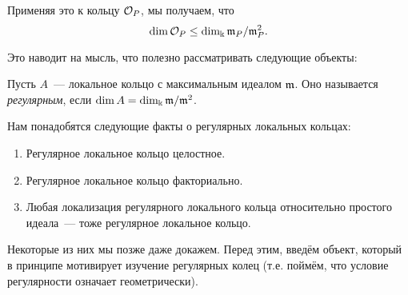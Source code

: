 	   	Применяя это к кольцу $\mathcal{O}_{P}$, мы получаем, что 
	   	\[
	   		\dim{\mathcal{O}_{P}} \le \dim_{\Bbbk}{\mathfrak{m}_P/\mathfrak{m}_P^2}.
	   	\]

	   	Это наводит на мысль, что полезно рассматривать следующие объекты:

	   	\begin{definition}\label{regular_rings} 
	   		Пусть $A$~--- локальное кольцо с максимальным идеалом $\mathfrak{m}$. Оно называется \emph{регулярным}, если $\dim{A} = \dim_{\Bbbk}{\mathfrak{m}/\mathfrak{m}^2}$.
	   	\end{definition}

	   	Нам понадобятся следующие факты о регулярных локальных кольцах: 

	   	\begin{enumerate}
	   		\item Регулярное локальное кольцо целостное. 

	   		\item Регулярное локальное кольцо факториально. 

	   		\item Любая локализация регулярного локального кольца относительно простого идеала~--- тоже регулярное локальное кольцо. 
	   	\end{enumerate}

	   	Некоторые из них мы позже даже докажем. Перед этим, введём объект, который в принципе мотивирует изучение регулярных колец (т.е. поймём, что условие регулярности означает геометрически). 

        

        
	   	
    

	 

	